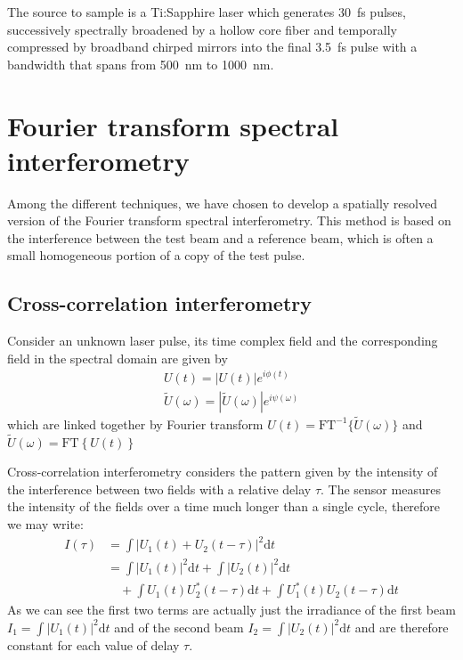 \documentclass[12pt,a4paper,twoside]{article}
\begin{document}
The source to sample is a Ti:Sapphire laser which generates \SI{30}{\fs} pulses, successively spectrally broadened by a hollow core fiber and temporally compressed by broadband chirped mirrors into the final \SI{3.5}{\fs} pulse with a bandwidth that spans from \SI{500}{\nm} to \SI{1000}{\nm}.

\clearpage
\section{Fourier transform spectral interferometry}
Among the different techniques, we have chosen to develop a spatially resolved version of the Fourier transform spectral interferometry.
This method is based on the interference between the test beam and a reference beam, which is often a small homogeneous portion of a copy of the test pulse.

\subsection{Cross-correlation interferometry}
Consider an unknown laser pulse, its time complex field and the corresponding field in the spectral domain are given by
\begin{gather}
	U(t) = |U(t)|e^{i\phi(t)} \\
	\tilde{U}(\omega) = |\tilde{U}(\omega)|e^{i\psi(\omega)}
	\label{eq_def}
\end{gather}
which are linked together by Fourier transform $U(t) = \mathrm{FT}^{-1} \lbrace \tilde{U}(\omega) \rbrace$ and $\tilde{U}(\omega) = \mathrm{FT} \left\lbrace U(t) \right\rbrace$

Cross-correlation interferometry considers the pattern given by the intensity of the interference between two fields with a relative delay $\tau$.
The sensor measures the intensity of the fields over a time much longer than a single cycle, therefore we may write:
\begin{align}
	I(\tau) 	&= \int|U_1(t)+U_2(t-\tau)|^2\mathrm{d}t \nonumber\\
			&= \int|U_1(t)|^2\mathrm{d}t + \int|U_2(t)|^2\mathrm{d}t \nonumber\\
			&\quad + \int U_1(t)U_2^*(t-\tau)\mathrm{d}t + \int U_1^*(t)U_2(t-\tau)\mathrm{d}t 
	\label{eq_xcorr}
\end{align}
As we can see the first two terms are actually just the irradiance of the first beam $I_1 = \int|U_1(t)|^2\mathrm{d}t$ and of the second beam $I_2 = \int|U_2(t)|^2\mathrm{d}t$ and are therefore constant for each value of delay $\tau$.
\end{document}
